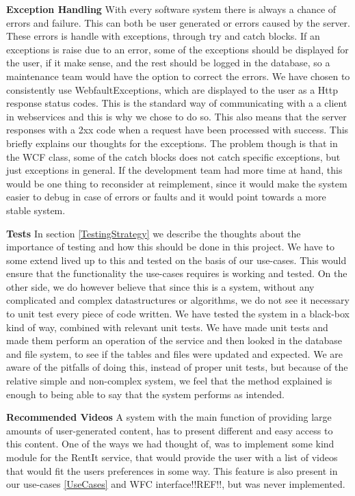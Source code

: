 \textbf{Exception Handling}
With every software system there is always a chance of errors and failure. This can both be user generated or errors caused by the server. These errors is handle with exceptions, through try and catch blocks. If an exceptions is raise due to an error, some of the exceptions should be displayed for the user, if it make sense, and the rest should be logged in the database, so a maintenance team would have the option to correct the errors. We have chosen to consistently use WebfaultExceptions, which are displayed to the user as a Http response status codes. This is the standard way of communicating with a a client in webservices and this is why we chose to do so. This also means that the server responses with a 2xx code when a request have been processed with success. This briefly explains our thoughts for the exceptions. The problem though is that in the WCF class, some of the catch blocks does not catch specific exceptions, but just exceptions in general. If the development team had more time at hand, this would be one thing to reconsider at reimplement, since it would make the system easier to debug in case of errors or faults and it would point towards a more stable system.  
 
\textbf{Tests}
In section \ref{TestingStrategy} we describe the thoughts about the importance of testing and how this should be done in this project. We have to some extend lived up to this and tested on the basis of our use-cases. This would ensure that the functionality the use-cases requires is working and tested. On the other side, we do however believe that since this is a system, without any complicated and complex datastructures or algorithms, we do not see it necessary to unit test every piece of code written. We have tested the system in a black-box kind of way, combined with relevant unit tests. We have made unit tests and made them perform an operation of the service and then looked in the database and file system, to see if the tables and files were updated and expected. We are aware of the pitfalls of doing this, instead of proper unit tests, but because of the relative simple and non-complex system, we feel that the method explained is enough to being able to say that the system performs as intended.

\textbf{Recommended Videos}
A system with the main function of providing large amounts of user-generated content, has to present different and easy access to this content. One of the ways we had thought of, was to implement some kind module for the RentIt service, that would provide the user with a list of videos that would fit the users preferences in some way. This feature is also present in our use-cases \ref{UseCases} and WFC interface!!REF!!, but was never implemented.

